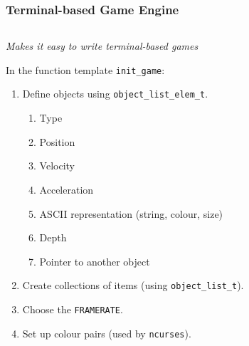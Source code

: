 \documentclass{beamer}
\begin{document}
\begin{frame}
	\frametitle{Terminal-based Game Engine}
	\begin{columns}
		\begin{column}{0.65\textwidth}
			\emph{Makes it easy to write terminal-based games}
			
			In the function template \texttt{init\_game}:
			\begin{enumerate}
				\item Define objects using \texttt{object\_list\_elem\_t}.
				\begin{enumerate}
					\item Type
					\item Position
					\item Velocity
					\item Acceleration
					\item ASCII representation (string, colour, size)
					\item Depth
					\item Pointer to another object
				\end{enumerate}
				\item Create collections of items (using \texttt{object\_list\_t}).
				\item Choose the \texttt{FRAMERATE}.
				\item Set up colour pairs (used by \texttt{ncurses}).
			\end{enumerate}
		\end{column}
		\begin{column}{0.35\textwidth}
			\begin{figure}

\end{figure}
\end{column}
\end{columns}
\end{frame}
\end{document}
